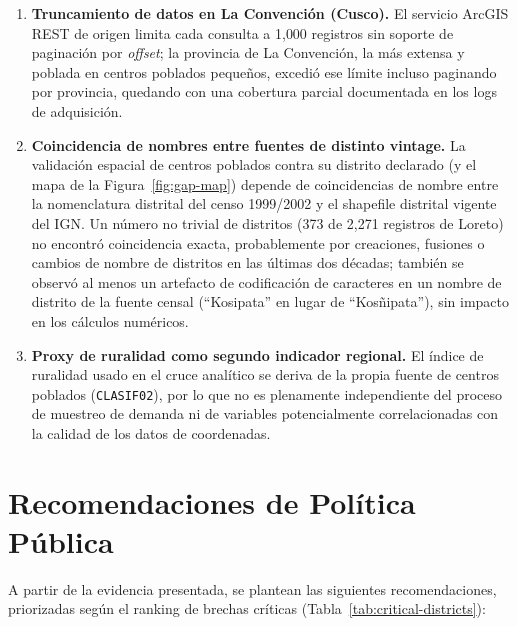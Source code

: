 \documentclass[11pt]{article}
\begin{document}
\begin{enumerate}
    varianza muestral.
  \item \textbf{Truncamiento de datos en La Convención (Cusco).} El
    servicio ArcGIS REST de origen limita cada consulta a 1{,}000
    registros sin soporte de paginación por \textit{offset}; la provincia
    de La Convención, la más extensa y poblada en centros poblados
    pequeños, excedió ese límite incluso paginando por provincia,
    quedando con una cobertura parcial documentada en los logs de
    adquisición.
  \item \textbf{Coincidencia de nombres entre fuentes de distinto vintage.}
    La validación espacial de centros poblados contra su distrito
    declarado (y el mapa de la Figura~\ref{fig:gap-map}) depende de
    coincidencias de nombre entre la nomenclatura distrital del censo
    1999/2002 y el shapefile distrital vigente del IGN. Un número no
    trivial de distritos (373 de 2{,}271 registros de Loreto) no encontró
    coincidencia exacta, probablemente por creaciones, fusiones o cambios
    de nombre de distritos en las últimas dos décadas; también se observó
    al menos un artefacto de codificación de caracteres en un nombre de
    distrito de la fuente censal (``Kos\dh ipata'' en lugar de
    ``Kosñipata''), sin impacto en los cálculos numéricos.
  \item \textbf{Proxy de ruralidad como segundo indicador regional.} El
    índice de ruralidad usado en el cruce analítico se deriva de la propia
    fuente de centros poblados (\texttt{CLASIF02}), por lo que no es
    plenamente independiente del proceso de muestreo de demanda ni de
    variables potencialmente correlacionadas con la calidad de los datos
    de coordenadas.
\end{enumerate}

\section{Recomendaciones de Política Pública}

A partir de la evidencia presentada, se plantean las siguientes
recomendaciones, priorizadas según el ranking de brechas críticas
(Tabla~\ref{tab:critical-districts}):
\end{document}
